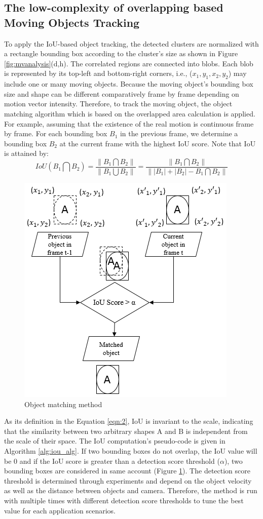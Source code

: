 \subsection{The low-complexity of overlapping based Moving Objects Tracking}
\label{subsec:1}
To apply the IoU-based object tracking, the detected clusters are normalized with a rectangle bounding box according to the cluster's size as shown in Figure \ref{fig:mvanalysis}(d,h). The correlated regions are connected into blobs. Each blob is represented by its top-left and bottom-right corners, i.e.,  ($x_{1}, y_{1}, x_{2}, y_{2}$) may include one or many moving objects. Because the moving object's bounding box size and shape can be different comparatively frame by frame depending on motion vector intensity. Therefore, to track the moving object, the object matching algorithm which is based on the overlapped area calculation is applied. For example,  assuming that the existence of the real motion is continuous frame by frame. For each bounding box $B_{1}$ in the previous frame, we determine a bounding box $B_{2}$ at the current frame with the highest IoU score. Note that IoU is attained by:\\
\begin{equation}
\label{eqn:2}
IoU(B_{1}\bigcap B_{2}) = \frac{\left \| B_{1}\bigcap B_{2} \right \|}{\left \| B_{1}\bigcup B_{2}  \right \|} =  \frac{\left \| B_{1}\bigcap B_{2} \right \|}{\left \| \left | B_{1} \right |  +  \left | B_{2} \right |  - B_{1}\bigcap B_{2} \right \|}
\end{equation} 
\begin{figure}
\centering
 \includegraphics[width=0.4\linewidth]{Figures/iou.png}
 \caption{Object matching method}
 \label{fig:iou}
\end{figure}
 As its definition in the Equation \ref{eqn:2}, IoU is invariant to the scale, indicating that the similarity between two arbitrary shapes A and B is independent from the scale of their space. The IoU computation’s pseudo-code is given in Algorithm \ref{alg:iou_alg}. If two bounding boxes do not overlap, the IoU value will be 0 and if the IoU score is greater than a detection score threshold ($\alpha$), two bounding boxes are considered in same account (Figure \ref{fig:iou}). The detection score threshold is determined through experiments and depend on the object velocity as well as the distance between objects and camera. Therefore, the method is run with multiple times with different detection score thresholds to tune the best value for each application scenarios. 
